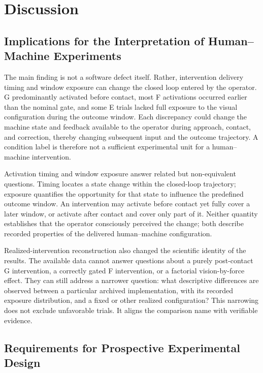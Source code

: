 \documentclass[journal]{IEEEtran}
\begin{document}
\section{Discussion}

\subsection{Implications for the Interpretation of Human--Machine Experiments}

The main finding is not a software defect itself. Rather, intervention delivery
timing and window exposure can change the closed loop entered by the operator.
G predominantly activated before contact, most F activations occurred earlier
than the nominal gate, and some E trials lacked full exposure to the visual
configuration during the outcome window. Each discrepancy could change the
machine state and feedback available to the operator during approach, contact,
and correction, thereby changing subsequent input and the outcome trajectory.
A condition label is therefore not a sufficient experimental unit for a
human--machine intervention.

Activation timing and window exposure answer related but non-equivalent
questions. Timing locates a state change within the closed-loop trajectory;
exposure quantifies the opportunity for that state to influence the predefined
outcome window. An intervention may activate before contact yet fully cover a
later window, or activate after contact and cover only part of it. Neither
quantity establishes that the operator consciously perceived the change; both
describe recorded properties of the delivered human--machine configuration.

Realized-intervention reconstruction also changed the scientific identity of
the results. The available data cannot answer questions about a purely
post-contact G intervention, a correctly gated F intervention, or a factorial
vision-by-force effect. They can still address a narrower question: what
descriptive differences are observed between a particular archived
implementation, with its recorded exposure distribution, and a fixed or other
realized configuration? This narrowing does not exclude unfavorable trials. It
aligns the comparison name with verifiable evidence.

\subsection{Requirements for Prospective Experimental Design}
\end{document}
